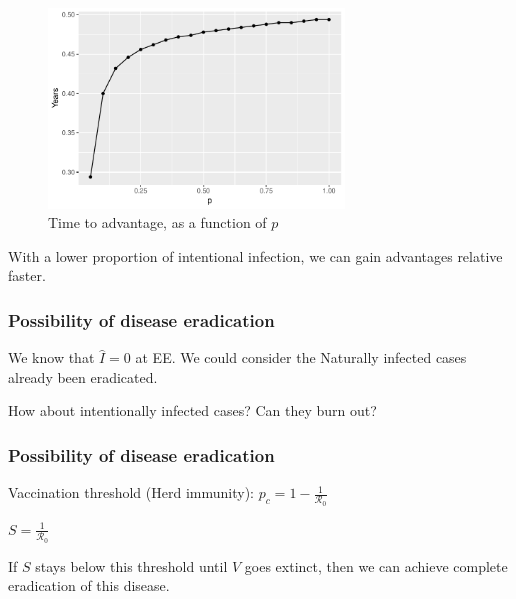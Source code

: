 \documentclass[12pt]{beamer}
\newcommand{\R}{\mathcal{R}}
\begin{document}
\begin{frame}
\begin{figure}[H]
  \centering
  \includegraphics[width=0.7\textwidth]{Figures/Time_to_advantage_plot.pdf}
  \caption{Time to advantage, as a function of $p$}
\end{figure}
With a lower proportion of intentional infection, we can gain advantages relative faster.
\end{frame}
\begin{frame}
\frametitle{Possibility of disease eradication}

We know that $\hat{I}=0$ at EE. We could consider the Naturally infected cases already been eradicated.

\pause
How about intentionally infected cases? Can they burn out?
\end{frame}
\begin{frame}
\frametitle{Possibility of disease eradication}

Vaccination threshold (Herd immunity): $p_c=1-\frac{1}{\R_0}$

\pause
\begin{center}
$S=\frac{1}{\R_0}$
\end{center}

\pause
If $S$ stays below this threshold until $V$ goes extinct, then we can achieve complete eradication of this disease.
\end{frame}
\end{document}
